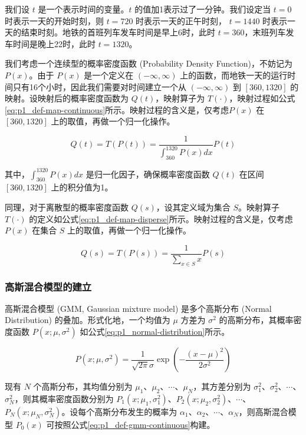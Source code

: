 \documentclass[12pt,a4paper]{mcmthesis}
\begin{document}
    我们设 $t$ 是一个表示时间的变量。$t$ 的值加1表示过了一分钟。我们设定当 $t=0$ 时表示一天的开始时刻，则 $t=720$ 时表示一天的正午时刻， $t=1440$ 时表示一天的结束时刻。地铁的首班列车发车时间是早上6时，此时 $t=360$，末班列车发车时间是晚上22时，此时 $t=1320$。

    我们考虑一个连续型的概率密度函数 (Probability Density Function)，不妨记为 $P(x)$。由于 $P(x)$ 是一个定义在 $(-\infty,\infty)$ 上的函数，而地铁一天的运行时间只有16个小时，因此我们需要对时间建立一个从 $(-\infty,\infty)$ 到 $[360,1320]$ 的映射。设映射后的概率密度函数为 $Q(t)$，映射算子为 $T(\cdot)$，映射过程如公式\ref{eq:p1_def-map-continuous}所示。映射过程的含义是，仅考虑$P(x)$ 在 $[360,1320]$ 上的取值，再做一个归一化操作。

    \begin{equation}
        Q(t) = T(P(t)) = \frac{1}{\int_{360}^{1320}P(x)dx} P(t)
        \label{eq:p1_def-map-continuous}
    \end{equation}

    其中，$\int_{360}^{1320}P(x)dx$ 是归一化因子，确保概率密度函数 $Q(t)$ 在区间 $[360,1320]$ 上的积分值为1。

    同理，对于离散型的概率密度函数 $Q(s)$，设其定义域为集合 $S$。映射算子 $T(\cdot)$ 的定义如公式\ref{eq:p1_def-map-disperse}所示。映射过程的含义是，仅考虑$P(x)$ 在集合 $S$ 上的取值，再做一个归一化操作。

    \begin{equation}
        Q(s) = T(P(s)) = \frac{1}{\sum_{x \in S} x} P(s)
        \label{eq:p1_def-map-disperse}
    \end{equation}

    \subsubsection{高斯混合模型的建立}

    高斯混合模型 (GMM, Gaussian mixture model) 是多个高斯分布 (Normal Distribution) 的叠加。形式化地，一个均值为 $\mu$ 方差为 $\sigma^2$ 的高斯分布，其概率密度函数 $P(x;\mu,\sigma^2)$ 如公式\ref{eq:p1_normal-distribution}所示。

    \begin{equation}
        P(x;\mu,\sigma^2) = \frac{1}{\sqrt{2\pi}\sigma} \exp \left( - \frac{(x-\mu)^2}{2\sigma^2} \right)
        \label{eq:p1_normal-distribution}
    \end{equation}

    现有 $N$ 个高斯分布，其均值分别为 $\mu_1$、$\mu_2$、$\cdots$、$\mu_N$，其方差分别为 $\sigma^2_1$、$\sigma^2_2$、$\cdots$、$\sigma^2_N$，则其概率密度函数分别为 $P_1(x;\mu_1,\sigma^2_1)$、$P_2(x;\mu_2,\sigma^2_2)$、$\cdots$、$P_N(x;\mu_N,\sigma^2_N)$。设每个高斯分布发生的概率为 $\alpha_1$、$\alpha_2$、$\cdots$、$\alpha_N$，则高斯混合模型 $P_0(x)$ 可按照公式\ref{eq:p1_def-gmm-continuous}构建。
\end{document}

